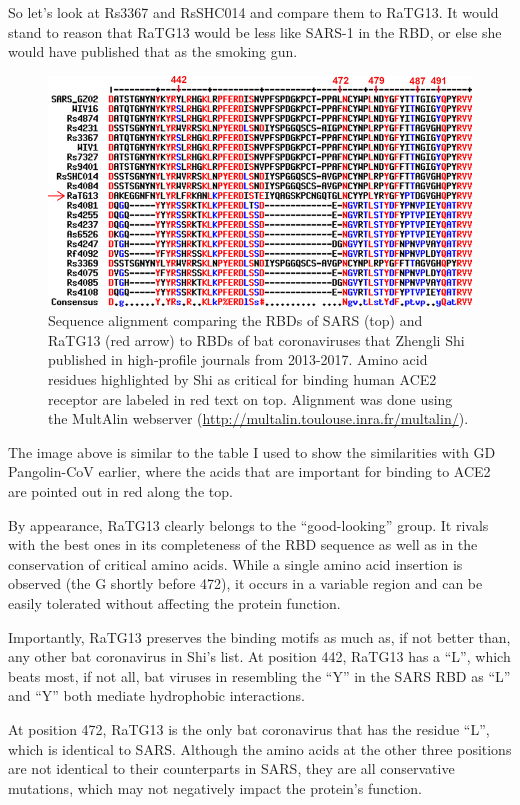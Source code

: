 \documentclass[11pt]{article}
\begin{document}
So let's look at Rs3367 and RsSHC014 and compare them to RaTG13. It would stand to reason that RaTG13 would be less like SARS-1 in the RBD, or else she would have published that as the smoking gun.

\begin{figure}[htbp]
\centering
\includegraphics[width=.9\linewidth]{./images/rbd-comp-zhengli.png}
\caption{Sequence alignment comparing the RBDs of SARS (top) and RaTG13 (red arrow) to RBDs of bat coronaviruses that Zhengli Shi published in high-profile journals from 2013-2017. Amino acid residues highlighted by Shi as critical for binding human ACE2 receptor are labeled in red text on top. Alignment was done using the MultAlin webserver (\url{http://multalin.toulouse.inra.fr/multalin/}).}
\end{figure}

The image above is similar to the table I used to show the similarities with GD Pangolin-CoV earlier, where the acids that are important for binding to ACE2 are pointed out in red along the top.

By appearance, RaTG13 clearly belongs to the “good-looking” group. It rivals with the best ones in its completeness of the RBD sequence as well as in the conservation of critical amino acids. While a single amino acid insertion is observed (the G shortly before 472), it occurs in a variable region and can be easily tolerated without affecting the protein function.

Importantly, RaTG13 preserves the binding motifs as much as, if not better than, any other bat coronavirus in Shi’s list. At position 442, RaTG13 has a “L”, which beats most, if not all, bat viruses in resembling the “Y” in the SARS RBD as “L” and “Y” both mediate hydrophobic interactions.

At position 472, RaTG13 is the only bat coronavirus that has the residue “L”, which is identical to SARS. Although the amino acids at the other three positions are not identical to their counterparts in SARS, they are all conservative mutations, which may not negatively impact the protein’s function.
\end{document}
